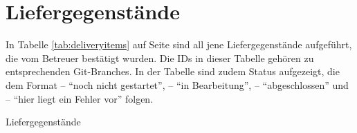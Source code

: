 \section{Liefergegenstände}\label{sec:deliveryitems}

In Tabelle \ref{tab:deliveryitems} auf Seite \pageref{tab:deliveryitems} sind all jene Liefergegenstände aufgeführt, die vom Betreuer bestätigt wurden.
Die IDs in dieser Tabelle gehören zu entsprechenden Git-Branches.
In der Tabelle sind zudem Status aufgezeigt, die dem Format \notstarted -- \enquote{noch nicht gestartet}, \inprogress -- \enquote{in Bearbeitung}, \finished -- \enquote{abgeschlossen} und \haserror -- \enquote{hier liegt ein Fehler vor} folgen.

\begin{table}

\caption{Liefergegenstände}\label{tab:deliveryitems}


\end{table}
